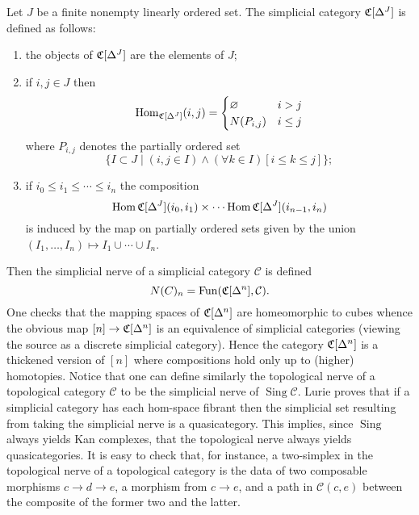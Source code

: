 \documentclass{amsart}
\DeclareMathOperator{\Fun}{Fun}
\DeclareMathOperator{\Sing}{Sing}
\begin{document}
\begin{definition}
    Let $J$ be a finite nonempty linearly ordered set. The simplicial category
    $\mathfrak{C}[\Delta^J]$ is defined as follows:
    \begin{enumerate}
        \item the objects of $\mathfrak{C}[\Delta^J]$ are the elements of $J$;
        \item if $i,j\in J$ then
            \begin{equation*}
                \operatorname{Hom}_{\mathfrak{C}[\Delta^J]}(i, j) =
                \begin{cases}
                    \varnothing & i > j \\
                    N(P_{i,j}) & i\leq j
                \end{cases}
            \end{equation*}
            where $P_{i,j}$ denotes the partially ordered set
            \begin{equation*}
                \{I\subset J \mid (i,j\in I)\wedge (\forall k\in I)[i\leq k\leq j]\};
            \end{equation*}
        \item if $i_0\leq i_1 \leq \cdots \leq i_n$ the composition
            \begin{equation*}
                \operatorname{Hom}{\mathfrak{C}[\Delta^J]}(i_0,i_1) \times \cdots \operatorname{Hom}{\mathfrak{C}[\Delta^J]}(i_{n-1},i_n)
            \end{equation*}
            is induced by the map on partially ordered sets given by the union
            $(I_1,\ldots,I_n)\mapsto I_1\cup\cdots \cup I_n$.
    \end{enumerate}
\end{definition}

Then the simplicial nerve of a simplicial category $\mathcal{C}$ is defined
\begin{equation*}
    N(C)_n = \Fun(\fr{C}[\Delta^n], \mathcal{C}).
\end{equation*}
One checks that the mapping spaces of $\mathfrak{C}[\Delta^n]$ are homeomorphic to
cubes whence the obvious map $[n]\to\mathfrak{C}[\Delta^n]$ is an equivalence of
simplicial categories (viewing the source as a discrete simplicial category).
Hence the category $\mathfrak{C}[\Delta^n]$ is a thickened version of $[n]$ where
compositions hold only up to (higher) homotopies. Notice that one can define
similarly the topological nerve of a topological category $\mathcal{C}$ to be
the simplicial nerve of $\Sing \mathcal{C}$. Lurie proves that if a simplicial
category has each hom-space fibrant then the simplicial set resulting from
taking the simplicial nerve is a quasicategory. This implies, since $\Sing$
always yields Kan complexes, that the topological nerve always yields quasicategories.
It is easy to check that, for instance, a two-simplex in the topological nerve
of a topological category is the data of two composable morphisms $c\to d\to e$,
a morphism from $c\to e$, and a path in $\mathcal{C}(c,e)$ between the composite
of the former two and the latter.
\end{document}
